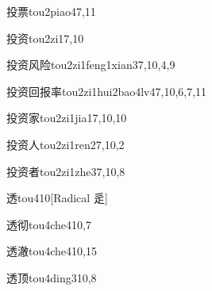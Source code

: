 \begin{verbete}{投票}{tou2piao4}{7,11}
\end{verbete}

\begin{verbete}{投资}{tou2zi1}{7,10}
\end{verbete}

\begin{verbete}{投资风险}{tou2zi1feng1xian3}{7,10,4,9}
\end{verbete}

\begin{verbete}{投资回报率}{tou2zi1hui2bao4lv4}{7,10,6,7,11}
\end{verbete}

\begin{verbete}{投资家}{tou2zi1jia1}{7,10,10}
\end{verbete}

\begin{verbete}{投资人}{tou2zi1ren2}{7,10,2}
\end{verbete}

\begin{verbete}{投资者}{tou2zi1zhe3}{7,10,8}
\end{verbete}

\begin{verbete}{透}{tou4}{10}[Radical 辵]
\end{verbete}

\begin{verbete}{透彻}{tou4che4}{10,7}
\end{verbete}

\begin{verbete}{透澈}{tou4che4}{10,15}
\end{verbete}

\begin{verbete}{透顶}{tou4ding3}{10,8}
\end{verbete}

